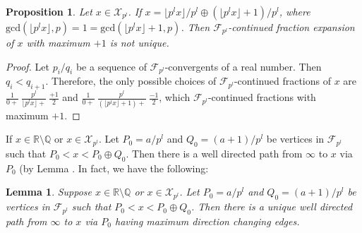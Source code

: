 \documentclass[12pt]{elsarticle}
\newtheorem{lemma}[theorem]{Lemma}
\newtheorem{proposition}[theorem]{Proposition}
\theoremstyle{definition}
\newcommand{\field}[1]{\mathbb{#1}}          \newcommand{\Q}{\field{Q}}
\newcommand{\R}{\field{R}}                   \newcommand{\Z}{\field{Z}}
\newcommand{\mX}{{\mathcal X}}
\newcommand{\f}{{\mathcal F}}
\begin{document}
	\begin{proposition}\label{nonuniquehalfpoint}
	Let $x\in\mX_{p^l}$. If $x=\lfloor p^lx\rfloor/p^l\oplus (\lfloor p^lx\rfloor+1)/p^l$, where $\mathrm{gcd}(\lfloor p^lx\rfloor,p)=1=\mathrm{gcd}(\lfloor p^lx\rfloor+1,p)$. Then $\f_{p^l}$-continued fraction expansion of $x$ with maximum $+1$ is not unique. 
\end{proposition}
\begin{proof}
Let $p_i/q_i$ be a sequence of $\f_{p^l}$-convergents of a real number. Then $q_i<q_{i+1}$. Therefore, the only possible choices of  $\f_{p^l}$-continued fractions of 	$x$ are $\frac{1}{0+}~\frac{p^l}{\lfloor p^lx\rfloor+}~\frac{+1 }{2}$ and $\frac{1}{0+}~\frac{p^l}{(\lfloor p^lx\rfloor+1)+}~\frac{-1 }{2}$, which $\f_{p^l}$-continued fractions with maximum $+1.$
\end{proof}
	If $ x\in\R\setminus\Q$ or $x\in\mX_{p^l}$. Let $P_0=a/p^l$ and $Q_0=(a+1)/p^l$ be  vertices in $ \f_{p^l}$ such that $P_0<x<P_0\oplus Q_0$. Then there is a well directed path from $\infty$ to $x$ via $P_0$ (by Lemma \cite[Lemma 4.1 ]{seemafnpart1}.  In fact, we have the following:
\begin{lemma}\label{lemma_uniquemaximumflips}
	Suppose $ x\in\R\setminus\Q$ or $x\in\mX_{p^l}$. Let $P_0=a/p^l$ and $Q_0=(a+1)/p^l$ be  vertices in $ \f_{p^l}$ such that $P_0<x<P_0\oplus Q_0$.
Then there is a unique  well directed path from $\infty$ to $x$ via $P_0$ having  maximum direction changing edges. 
\end{lemma}
\end{document}
